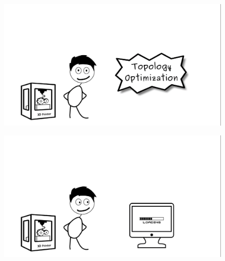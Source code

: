 \begin{frame}
\begin{figure}

\vspace{-.7cm}	
\hspace{-2cm}		\includegraphics[width=1.2\linewidth]{Pictures/animations/animation_7.png}
		\end{figure}

\end{frame}

\begin{frame}
\begin{figure}

\vspace{-.7cm}	
\hspace{-2cm}		\includegraphics[width=1.2\linewidth]{Pictures/animations/animation_8.png}
		\end{figure}

\end{frame}


